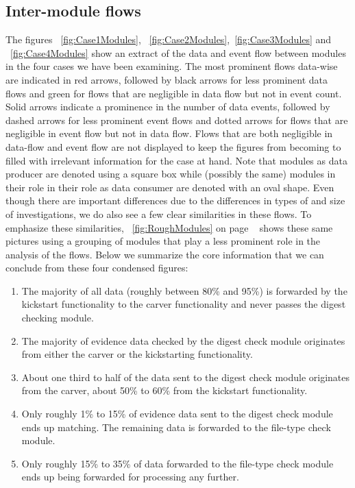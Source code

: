 \subsection{Inter-module flows}
The figures ~\ref{fig:Case1Modules}, ~\ref{fig:Case2Modules},~\ref{fig:Case3Modules} and ~\ref{fig:Case4Modules} show an extract of the data and event flow between modules in the four cases we have been examining. The most prominent flows data-wise are indicated in red arrows, followed by black arrows for less prominent data flows and green for flows that are negligible in data flow but not in event count. Solid arrows indicate a prominence in the number of data events, followed by dashed arrows for less prominent event flows and dotted arrows for flows that are
negligible in event flow but not in data flow. Flows that are both negligible in data-flow and event flow are not displayed to keep the figures from becoming to filled with irrelevant information for the case at hand. Note that modules as data producer are denoted using a square box while (possibly the same) modules in their role in their role as data consumer are denoted with an oval shape. Even though there are important differences due to the differences in types of and size of investigations, we do also see a few clear similarities in these flows. To emphasize these similarities, ~\ref{fig:RoughModules} on page ~\pageref{fig:RoughModules} shows these same pictures using a grouping of modules that play a less prominent role in the analysis of the flows. Below we summarize the core information that we can conclude from these four condensed figures:
\begin{enumerate}
\item The majority of all data (roughly between 80\% and 95\%) is forwarded by the kickstart functionality to the carver functionality and never passes the digest checking module.
\item The majority of evidence data checked by the digest check module originates from either the carver or the kickstarting functionality.
\item About one third to half of the data sent to the digest check module originates from the carver, about 50\% to 60\% from the kickstart functionality.
\item Only roughly 1\% to 15\% of evidence data sent to the digest check module ends up matching. The remaining data is forwarded to the file-type check module.
\item Only roughly 15\% to 35\% of data forwarded to the file-type check module ends up being forwarded for processing any further.
\end{enumerate} 
